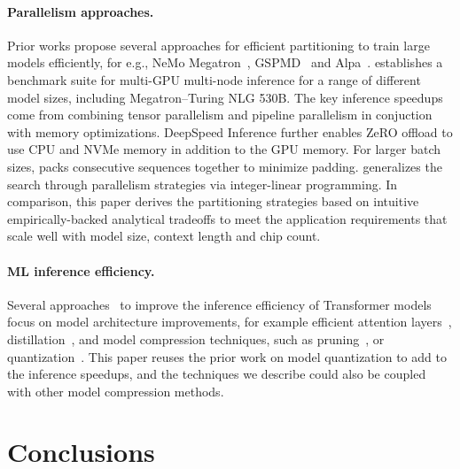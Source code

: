 \paragraph{Parallelism approaches.} Prior works propose several approaches for efficient partitioning to train large models efficiently, for e.g., NeMo Megatron~\cite{korthikanti2022reducing}, GSPMD~\cite{xu2021gspmd} and Alpa~\cite{zheng2022alpa}. \citet{fastertransformer} establishes a benchmark suite for multi-GPU multi-node inference for a range of different model sizes, including Megatron--Turing NLG 530B. The key inference speedups come from combining tensor parallelism and pipeline parallelism in conjuction with memory optimizations. DeepSpeed Inference \cite{aminabadi2022deepspeed} further enables ZeRO offload to use CPU and NVMe memory in addition to the GPU memory. For larger batch sizes, \citet{effectivetransformer} packs consecutive sequences together to minimize padding. \citet{zheng2022alpa} generalizes the search through parallelism strategies via integer-linear programming. In comparison, this paper derives the partitioning strategies based on intuitive empirically-backed analytical tradeoffs  to meet the application requirements that scale well with model size, context length and chip count. 

\paragraph{ML inference efficiency.} Several approaches~\cite{gupta2020compression} to improve the inference efficiency of Transformer models focus on model architecture improvements, for example efficient attention layers~\cite{roy2020efficient,choromanski2020rethinking, kitaev2020reformer, sukhbaatar2019adaptive, child2019generating}, distillation~\cite{sanh2019distilbert,sun2020mobilebert}, and model compression techniques, such as pruning~\cite{li2020train, brix2020successfully,zhou2021learning, li2020efficient, wang2020hat}, or quantization~\cite{dettmers2022llm,abdolrashidi2021pareto,zafrir2019q8bert,zhang2018lq}. This paper reuses the prior work on model quantization to add to the inference speedups, and the techniques we describe could also be coupled with other model compression methods.

\section{Conclusions}\label{sec:conclusions}

